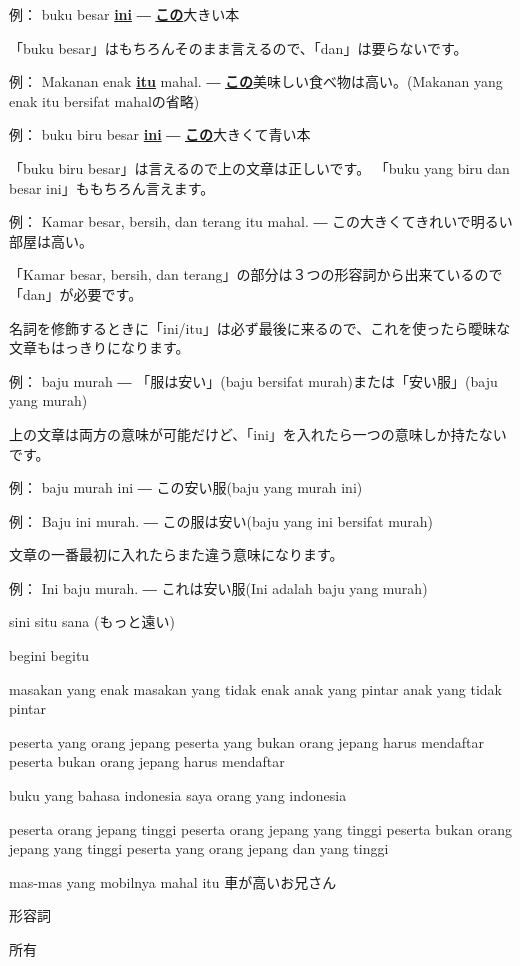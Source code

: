 \documentclass[uplatex]{jsarticle}
\theoremstyle{definition}
\newcommand{\example}[2]{
例： #1 ― #2
}
\newcommand{\bu}[1]{\underline{\textbf{#1}}}
\newcommand{\bi}[1]{\bu{#1}}
\newcommand{\bj}[1]{\bu{#1}}
\begin{document}
\example{buku besar \bi{ini}}{\bj{この}大きい本}

「buku besar」はもちろんそのまま言えるので、「dan」は要らないです。

\example{Makanan enak \bi{itu} mahal.}{\bj{この}美味しい食べ物は高い。(Makanan yang enak itu bersifat mahalの省略)}

\example{buku biru besar \bi{ini}}{\bj{この}大きくて青い本}

「buku biru besar」は言えるので上の文章は正しいです。
「buku yang biru dan besar ini」ももちろん言えます。

\example{Kamar besar, bersih, dan terang itu mahal.}{この大きくてきれいで明るい部屋は高い。}

「Kamar besar, bersih, dan terang」の部分は３つの形容詞から出来ているので「dan」が必要です。

名詞を修飾するときに「ini/itu」は必ず最後に来るので、これを使ったら曖昧な文章もはっきりになります。

\example{baju murah}{「服は安い」(baju bersifat murah)または「安い服」(baju yang murah)}

上の文章は両方の意味が可能だけど、「ini」を入れたら一つの意味しか持たないです。

\example{baju murah ini}{この安い服(baju yang murah ini)}

\example{Baju ini murah.}{この服は安い(baju yang ini bersifat murah)}

文章の一番最初に入れたらまた違う意味になります。

\example{Ini baju murah.}{これは安い服(Ini adalah baju yang murah)}

sini
situ
sana (もっと遠い)

begini
begitu




masakan yang enak masakan yang tidak enak anak yang pintar anak yang
tidak pintar

peserta yang orang jepang peserta yang bukan orang jepang harus
mendaftar peserta bukan orang jepang harus mendaftar

buku yang bahasa indonesia saya orang yang indonesia

peserta orang jepang tinggi peserta orang jepang yang tinggi peserta
bukan orang jepang yang tinggi peserta yang orang jepang dan yang tinggi

mas-mas yang mobilnya mahal itu 車が高いお兄さん

形容詞



所有
\end{document}
